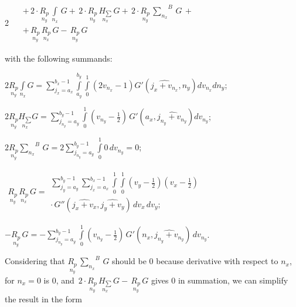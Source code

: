 \documentclass[twoside, 10pt]{article}
\begin{document}
\begin{multicols}{2}
    \(\begin{array}{rr}
\, & +\,2\cdot\underset{n_y}{R_{p}}\,\int\limits_{n_x}^{}\,G +\,2\cdot\underset{n_y}{R_{p}}\,\underset{n_x}{H_{\sum}}\,G +\,2\cdot\underset{n_y}{R_{p}}\,{\sum\limits_{n_x}^{}}^{B}\,G\,+ \\
\, & +\,\underset{n_y}{R_{p}}\,\underset{n_x}{R_{p}}\,G -\,\underset{n_y}{R_{p}}\,G
\end{array}\)

    with the following summands:

\noindent
\(2 \underset{n_y}{R_{p}}\int\limits_{n_x}^{} G = {\sum\limits_{j_{x}=a_{x}}^{b_{x} - 1} \int\limits_{a_{y}}^{b_{y}} \int\limits_{0}^{1} {\left(2 v_{n_{x}} - 1\right)} G'\left(\widehat{j_{x} + v_{n_{x}}}, n_{y}\right) {d v_{n_{x}}} {d n_{y}}}\);

\noindent
\(2 \underset{n_y}{R_{p}}\underset{n_x}{H_{\sum}} G = {\sum\limits_{j_{n_{y}}=a_{y}}^{b_{y} - 1} \int\limits_{0}^{1}  {\left(v_{n_{y}} - \frac{1}{2}\right)}\,G'\left(a_{x}, \widehat{j_{n_{y}} + v_{n_{y}}}\right) {d v_{n_{y}}}}\);

\(2 \underset{n_y}{R_{p}}{\sum\limits_{n_x}^{}}^{B}\,G = 2 {\sum\limits_{j_{n_{y}}=a_{y}}^{b_{y} - 1} \int\limits_{0}^{1} 0\,{d v_{n_{y}}}} = 0\);


\noindent
$\begin{array}{lr}
\underset{n_y}{R_{p}}\,\underset{n_x}{R_{p}}\,G =
\begin{array}{c}
 \sum\limits_{j_{y}=a_{y}}^{b_{y} - 1} \sum\limits_{j_{x}=a_{x}}^{b_{x} - 1} \int\limits_{0}^{1} \int\limits_{0}^{1} \left(v_{y} - \frac{1}{2}\right)  \left(v_{x} - \frac{1}{2}\right) \\
\cdot \, G''\left(\widehat{j_{x} + v_{x}}, \widehat{j_{y} + v_{y}}\right)\,{d v_{x}}\,{d v_{y}};
\end{array}
\end{array}$

\noindent
\(-\underset{n_y}{R_{p}}\,G = -{\sum\limits_{j_{n_{y}}=a_{y}}^{b_{y} - 1} \int\limits_{0}^{1} {\left(v_{n_{y}} - \frac{1}{2}\right)}\,G'\left(n_{x}, \widehat{j_{n_{y}} + v_{n_{y}}}\right)\,{d v_{n_{y}}}}\).

    Considering that \(\underset{n_y}{R_{p}}\,{\sum\limits_{n_x}^{}}^{B}\,G\)
should be \(0\) because derivative with respect to \(n_x\), for
\(n_x = 0\) is \(0\), and
\(\,2\cdot\underset{n_y}{R_{p}}\,\underset{n_x}{H_{\sum}}\,G -\,\underset{n_y}{R_{p}}\,G\)
gives \(0\) in summation, we can simplify the result in the form

\end{multicols}
\vspace{-3.5mm}
\end{document}
